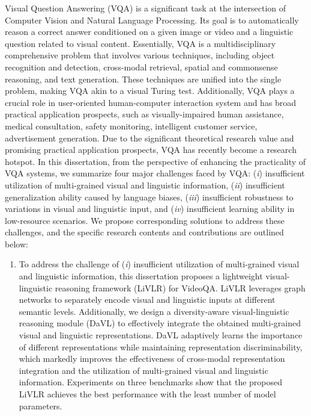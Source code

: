 
\begin{englishabstract}

Visual Question Answering (VQA) is a significant task at the intersection of Computer Vision and Natural Language Processing. 
Its goal is to automatically reason a correct answer conditioned on a given image or video and a linguistic question related to visual content. 
Essentially, VQA is a multidisciplinary comprehensive problem that involves various techniques, including object recognition and detection, cross-modal retrieval, spatial and commonsense reasoning, and text generation. 
These techniques are unified into the single problem, making VQA akin to a visual Turing test. 
Additionally, VQA plays a crucial role in user-oriented human-computer interaction system and has broad practical application prospects, such as visually-impaired human assistance, medical consultation, safety monitoring, intelligent customer service, advertisement generation. 
Due to the significant theoretical research value and promising practical application prospects, VQA has recently become a research hotspot. 
In this dissertation, from the perspective of enhancing the practicality of VQA systems, we summarize four major challenges faced by VQA: (\emph{i}) insufficient utilization of multi-grained visual and linguistic information, (\emph{ii}) insufficient generalization ability caused by language biases, (\emph{iii}) insufficient robustness to variations in visual and linguistic input, and (\emph{iv}) insufficient learning ability in low-resource scenarios. 
We propose corresponding solutions to address these challenges, and the specific research contents and contributions are outlined below: 


\begin{enumerate}[wide,leftmargin=0pt]

\item To address the challenge of (\emph{i}) insufficient utilization of multi-grained visual and linguistic information, this dissertation proposes a lightweight visual-linguistic reasoning framework (LiVLR) for VideoQA. 
LiVLR leverages graph networks to separately encode visual and linguistic inputs at different semantic levels. 
Additionally, we design a diversity-aware visual-linguistic reasoning module (DaVL) to effectively integrate the obtained multi-grained visual and linguistic representations. 
DaVL adaptively learns the importance of different representations while maintaining representation discriminability, which markedly improves the effectiveness of cross-modal representation integration and the utilization of multi-grained visual and linguistic information. 
Experiments on three benchmarks show that the proposed LiVLR achieves the best performance with the least number of model parameters. 



\end{enumerate}
\end{englishabstract}
